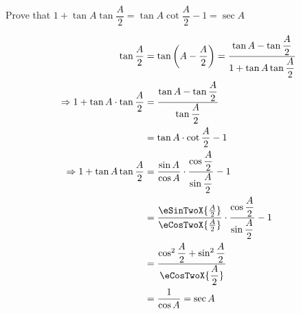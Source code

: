 
%
%
%
%
% 
% 

\question Prove that $1+\tan A\tan \dfrac{A}{2} = \tan A\cot\dfrac{A}{2} - 1 = \sec A$

\insertQR{}

\ifprintanswers
\fi 

\begin{solution}
   \begin{align}
      \tan\dfrac{A}{2} &= \tan\left( A - \dfrac{A}{2}\right) = \dfrac{\tan A - \tan\dfrac{A}{2}}{1 + \tan A\tan\dfrac{A}{2}} \\
       \Rightarrow 1 + \tan A\cdot\tan\dfrac{A}{2} &= \dfrac{\tan A-\tan\dfrac{A}{2}}{\tan\dfrac{A}{2}} \\
         &= \tan A\cdot\cot\dfrac{A}{2} - 1 \\
      \Rightarrow 1 + \tan A\tan\dfrac{A}{2} &= 
      \dfrac{\sin A}{\cos A}\cdot\dfrac{\cos\dfrac{A}{2}}{\sin\dfrac{A}{2}} - 1 \\
      &= \dfrac{\eSinTwoX{\frac{A}{2}}}{\eCosTwoX{\frac{A}{2}}}\cdot
      \dfrac{\cos\dfrac{A}{2}}{\sin\dfrac{A}{2}} - 1 \\
      &= \dfrac{\cos^2 \dfrac{A}{2} + \sin^2 \dfrac{A}{2}}{\eCosTwoX{\dfrac{A}{2}}} \\
      &= \dfrac{1}{\cos A} = \sec A
   \end{align}
\end{solution}
